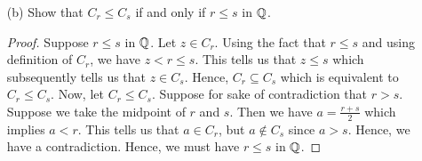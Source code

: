 \begin{enumerate}
\begin{proof}
   Now, we show the reverse inclusion. Suppose \( x \in C_{rs} \), then \( x < rs \) for \( r,s \geq 0  \) in \( \Q  \). Suppose \( r,s > 0  \) (if \( r,s = 0  \) then the result follows immediately), then dividing by \( r  \) on both sides gives us \( x /r  < s   \) which tells us that \( x / r \in C_{s}  \). Similarly, we can divide by \(  s  \) to get \( x / s < r  \) which implies \( x / s \in C_{r}  \). Hence, taking the product of these two elements leads to 
   \[  \frac{ x }{ s }  \cdot \frac{ x }{ r }  < (rs)^{2} \iff \frac{ x  }{ s^{2}  } \cdot \frac{ x  }{ r^{2} } < rs . \] Hence, we must have \( x \in C_{r}C_{s} \) and thus we have \(  C_{rs } \subseteq C_{r}C_{s} \). 
        \end{proof}
    \item[(b)] Show that \( C_{r} \leq C_{s}  \) if and only if \( r \leq s  \) in \( \Q  \).
        \begin{proof}
        Suppose \( r \leq s  \) in \( \Q  \). Let \( z \in C_{r}  \). Using the fact that \( r \leq s  \) and using definition of \( C_{r}  \), we have \( z < r \leq s   \). This tells us that \( z \leq s  \) which subsequently tells us that \( z \in C_{s}   \). Hence, \( C_{r } \subseteq C_{s}  \) which is equivalent to \( C_{r} \leq C_{s} \). Now, let \( C_{r} \leq C_{s}  \). Suppose for sake of contradiction that \( r > s  \). Suppose we take the midpoint of \( r  \) and \( s \). Then we have \( a = \frac{ r+s }{ 2 }  \) which implies \( a < r  \). This tells us that \( a \in C_{r} \), but \( a \notin C_{s} \) since \( a > s  \). Hence, we have a contradiction. Hence, we must have \( r \leq s  \) in \( \Q  \).      
        \end{proof}
\end{enumerate}
